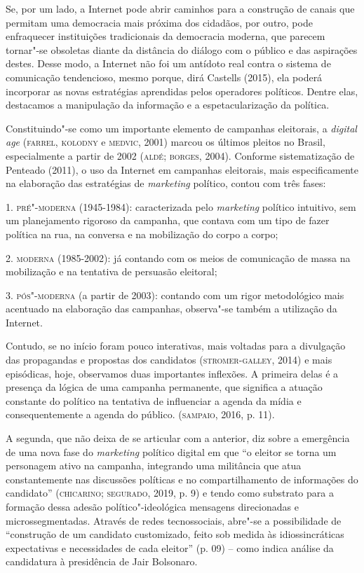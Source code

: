 Se, por um lado, a Internet pode abrir caminhos para a construção de
canais que permitam uma democracia mais próxima dos cidadãos, por outro,
pode enfraquecer instituições tradicionais da democracia moderna, que
parecem tornar"-se obsoletas diante da distância do diálogo com o público
e das aspirações destes. Desse modo, a Internet não foi um antídoto real
contra o sistema de comunicação tendencioso, mesmo porque, dirá Castells
(2015), ela poderá incorporar as novas estratégias aprendidas pelos
operadores políticos. Dentre elas, destacamos a manipulação da
informação e a espetacularização da política.

Constituindo"-se como um importante elemento de campanhas eleitorais, a
\emph{digital age} (\textsc{farrel}, \textsc{kolodny} e \textsc{medvic}, 2001) marcou os últimos
pleitos no Brasil, especialmente a partir de 2002 (\textsc{aldé}; \textsc{borges}, 2004).
Conforme sistematização de Penteado (2011), o uso da Internet em
campanhas eleitorais, mais especificamente na elaboração das estratégias
de \emph{marketing} político, contou com três fases:

1. \textsc{pré"-moderna} (1945-1984): caracterizada pelo \emph{marketing} político
intuitivo, sem um planejamento rigoroso da campanha, que contava com um
tipo de fazer política na rua, na conversa e na mobilização do corpo a
corpo;

2. \textsc{moderna} (1985-2002): já contando com os meios de comunicação de massa
na mobilização e na tentativa de persuasão eleitoral;

3. \textsc{pós"-moderna} (a partir de 2003): contando com um rigor metodológico
mais acentuado na elaboração das campanhas, observa"-se também a
utilização da Internet.

Contudo, se no início foram pouco interativas, mais voltadas para a
divulgação das propagandas e propostas dos candidatos (\textsc{stromer}-\textsc{galley},
2014) e mais episódicas, hoje, observamos duas importantes inflexões. A
primeira delas é a presença da lógica de uma campanha permanente, que
significa a atuação constante do político na tentativa de influenciar a
agenda da mídia e consequentemente a agenda do público. (\textsc{sampaio}, 2016,
p. 11).

A segunda, que não deixa de se articular com a anterior, diz sobre a
emergência de uma nova fase do \emph{marketing} político digital em que
``o eleitor se torna um personagem ativo na campanha, integrando uma
militância que atua constantemente nas discussões políticas e no
compartilhamento de informações do candidato'' (\textsc{chicarino}; \textsc{segurado},
2019, p. 9) e tendo como substrato para a formação dessa adesão
político"-ideológica mensagens direcionadas e microssegmentadas. Através
de redes tecnossociais, abre"-se a possibilidade de ``construção de um
candidato customizado, feito sob medida às idiossincráticas expectativas
e necessidades de cada eleitor'' (p. 09) -- como indica análise da
candidatura à presidência de Jair Bolsonaro.

